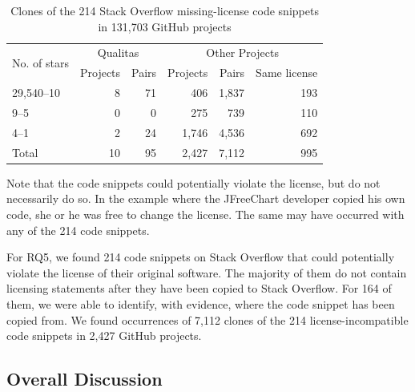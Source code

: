 \documentclass[10pt,journal,compsoc]{IEEEtran}
\newenvironment{boxquote}{\vspace{-1ex}\setlength{\FrameSep}{1\fboxsep}\begin{framed}\setlength{\parskip}{0.5\baselineskip}\setlength{\parindent}{0pt}}{\end{framed}}
\begin{document}
\begin{table}
	\centering
	\begin{tabular}{lrrrrr}
		\toprule
		\multirow{2}{*}{No. of stars} & \multicolumn{2}{c}{Qualitas} & \multicolumn{3}{c}{Other Projects} \\ \cmidrule{2-6}
		& Projects & Pairs & Projects & Pairs & Same license \\
		\midrule
		29,540--10 & 8 & 71 & 406 & 1,837 & 193 \\
		9--5 & 0 & 0 & 275 & 739 & 110 \\
		4--1 & 2 & 24 & 1,746 & 4,536 & 692 \\
		\midrule
		Total & 10 & 95 & 2,427 & 7,112 & 995 \\
		\bottomrule
	\end{tabular}
	\caption{Clones of the 214 Stack Overflow missing-license code snippets in 131,703 GitHub projects}
	\label{tab:license_github}
\end{table}

Note that the code snippets could potentially violate the license, but do
not necessarily do so. In the example where the JFreeChart
developer copied his own code, she or he was free to change the
license. The same may have occurred with any of the 214 code
snippets.

\begin{boxquote}
	For RQ5, we found 214 code snippets on Stack Overflow that
	could potentially violate the license of their original software. The majority of them
	do not contain licensing statements after they have been copied to
	Stack Overflow. For 164 of them, we were able to identify,
	with evidence, where the code snippet has been copied from.
	We found occurrences of 7,112 clones of the 214 license-incompatible code snippets
	in 2,427 GitHub projects.
\end{boxquote}

\subsection{Overall Discussion} %
\end{document}
